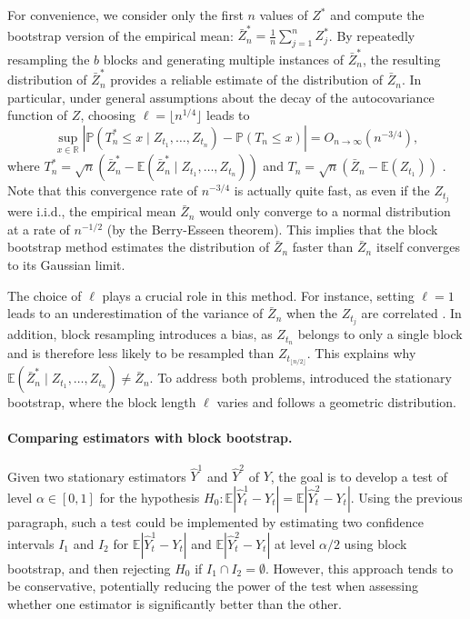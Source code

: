 For convenience, we consider only the first $n$ values of $Z^\ast$ and compute the bootstrap version of the empirical mean: $\bar{Z}^\ast_n=\frac{1}{n}\sum_{j=1}^nZ^\ast_j$. By repeatedly resampling the $b$ blocks and generating multiple instances of $\bar{Z}^\ast_n$, the resulting distribution of $\bar{Z}^\ast_n$  provides a reliable estimate of the distribution of $\bar{Z}_n$.
In particular, under general assumptions about the decay of the autocovariance function of $Z$, choosing $\ell = \lfloor n^{1/4} \rfloor$ leads to 
\[\sup_{x\in\mathbb{R}}|\mathbb{P}(T^{\ast}_n\leq x\mid Z_{t_1},\hdots,Z_{t_n})-\mathbb{P}(T_n\leq x)| = O_{n\to \infty}(n^{-3/4}),\]  where $T^{\ast}_n=\sqrt n(\bar{Z}^\ast_n-\mathbb{E}(\bar{Z}^\ast_n\mid Z_{t_1},\hdots,Z_{t_n}))$ and $T_n=\sqrt n(\bar{Z}_n-\mathbb{E}(Z_{t_1}))$ \citep[see, e.g.][Theorem 6.7]{lahiri2013resampling}.
Note that this convergence rate of $n^{-3/4}$ is actually quite fast, as even if the $Z_{t_j}$  were i.i.d., the empirical mean $\bar{Z}_n$  would only converge to a normal distribution at a rate of $n^{-1/2}$
(by the Berry-Esseen theorem). This implies that the block bootstrap method estimates the distribution of $\bar{Z}_n$ faster than $\bar{Z}_n$  itself converges to its Gaussian limit.

The choice of $\ell$ plays a crucial role in this method.
For instance, setting $\ell = 1$ leads to an underestimation of the variance of $\bar{Z}_n$  when the $Z_{t_j}$ are correlated \citep[see, e.g.][Corollary 2.1]{lahiri2013resampling}.
In addition, block resampling introduces a bias, as $Z_{t_n}$ belongs to only a single block and is therefore less likely to be resampled than  $Z_{t_{\lfloor n/2\rfloor}}$.
This explains why $\mathbb{E}(\bar{Z}^\ast_n \mid Z_{t_1}, \dots, Z_{t_n}) \neq \bar{Z}_n$.
To address both problems, \citet{politis1994stationary} introduced the stationary bootstrap, where the block length $\ell$ varies and follows a geometric distribution.

\paragraph{Comparing estimators with block bootstrap.}
Given two stationary estimators $\hat Y^1$ and $\hat Y^2$ of $Y$,  the goal is to develop a test of level $\alpha \in [0,1]$ for the hypothesis $H_0: \mathbb E|\hat Y^1_t-Y_t| = \mathbb E|\hat Y^2_t-Y_t|$. Using the previous paragraph, such a test could be implemented by estimating two confidence intervals $I_1$ and $I_2$ for $\mathbb E|\hat Y^1_t-Y_t|$ and $\mathbb E|\hat Y^2_t-Y_t|$ at level $\alpha/2$ using block bootstrap, and then rejecting $H_0$  if  $I_1 \cap I_2 = \emptyset$. However, this approach tends to be conservative, potentially reducing the power of the test when assessing whether one estimator is significantly better than the other.  

